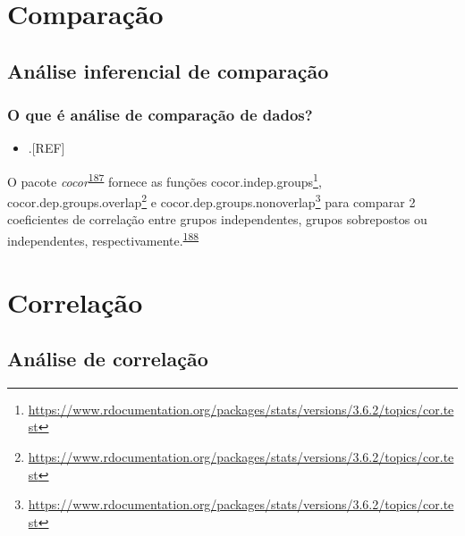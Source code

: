 \documentclass[
  a4paper,
]{book}
\providecommand{\tightlist}{%
  \setlength{\itemsep}{0pt}\setlength{\parskip}{0pt}}
\renewcommand{\href}[2]{#2\footnote{\url{#1}}}
\newenvironment{infobox}[1]
  {
  \begin{itemize}
  \renewcommand{\labelitemi}{
    \raisebox{-.7\height}[0pt][0pt]{
      {\setkeys{Gin}{width=3em,keepaspectratio}
        \texttt{[image: \#1]}}
    }
  }
  \setlength{\fboxsep}{1em}
  \begin{blackbox}
  \item
  }
  {
  \end{blackbox}
  \end{itemize}
  }
\begin{document}
\hypertarget{analise-comparacao}{%
\chapter{\texorpdfstring{\textbf{Comparação}}{Comparação}}\label{analise-comparacao}}

\hypertarget{analise-inferencial-comparacao}{%
\section{Análise inferencial de comparação}\label{analise-inferencial-comparacao}}

\hypertarget{o-que-uxe9-anuxe1lise-de-comparauxe7uxe3o-de-dados}{%
\subsection{O que é análise de comparação de dados?}\label{o-que-uxe9-anuxe1lise-de-comparauxe7uxe3o-de-dados}}

\begin{itemize}
\tightlist
\item
  .{[}REF{]}
\end{itemize}

\begin{infobox}{images/Rlogo}
O pacote \emph{cocor}\textsuperscript{\protect\hyperlink{ref-cocor-4}{187}} fornece as funções \href{https://www.rdocumentation.org/packages/stats/versions/3.6.2/topics/cor.test}{cocor.indep.groups}, \href{https://www.rdocumentation.org/packages/stats/versions/3.6.2/topics/cor.test}{cocor.dep.groups.overlap} e \href{https://www.rdocumentation.org/packages/stats/versions/3.6.2/topics/cor.test}{cocor.dep.groups.nonoverlap} para comparar 2 coeficientes de correlação entre grupos independentes, grupos sobrepostos ou independentes, respectivamente.\textsuperscript{\protect\hyperlink{ref-cocor}{188}}

\end{infobox}

\hypertarget{analise-inferencial-correlacao}{%
\chapter{\texorpdfstring{\textbf{Correlação}}{Correlação}}\label{analise-inferencial-correlacao}}

\hypertarget{analise-correlacao}{%
\section{Análise de correlação}\label{analise-correlacao}}
\end{document}
